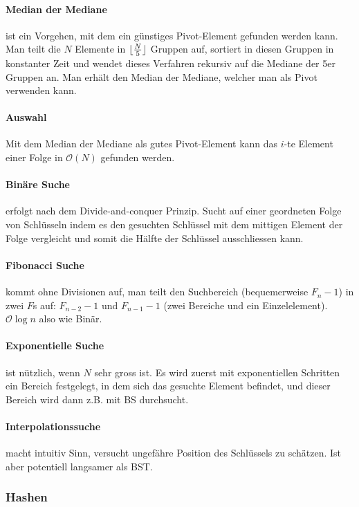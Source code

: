 \documentclass[a4paper, 9pt, DIV=20]{scrartcl}
\DeclarePairedDelimiter{\floor}{\lfloor}{\rfloor}
\newcommand{\Oh}{\mathcal{O}}
\begin{document}
\paragraph{Median der Mediane} ist ein Vorgehen, mit dem ein günstiges Pivot-Element gefunden werden kann. Man teilt die $N$ Elemente in $\floor{\frac{N}{5}}$ Gruppen auf, sortiert in diesen Gruppen in konstanter Zeit und wendet dieses Verfahren rekursiv auf die Mediane der 5er Gruppen an. Man erhält den Median der Mediane, welcher man als Pivot verwenden kann.

\paragraph{Auswahl} Mit dem Median der Mediane als gutes Pivot-Element kann das $i$-te Element einer Folge in $\Oh(N)$ gefunden werden.

\paragraph{Binäre Suche} erfolgt nach dem Divide-and-conquer Prinzip. Sucht auf einer geordneten Folge von Schlüsseln indem es den gesuchten Schlüssel mit dem mittigen Element der Folge vergleicht und somit die Hälfte der Schlüssel ausschliessen kann.

\paragraph{Fibonacci Suche} kommt ohne Divisionen auf, man teilt den Suchbereich (bequemerweise $F_{n}-1$) in zwei $F$s auf: $F_{n-2}-1$ und $F_{n-1}-1$ (zwei Bereiche und ein Einzelelement). $\Oh{\log{n}}$ also wie Binär.

\paragraph{Exponentielle Suche} ist nützlich, wenn $N$ sehr gross ist. Es wird zuerst mit exponentiellen Schritten ein Bereich festgelegt, in dem sich das gesuchte Element befindet, und dieser Bereich wird dann z.B. mit BS durchsucht.

\paragraph{Interpolationssuche} macht intuitiv Sinn, versucht ungefähre Position des Schlüssels zu schätzen. Ist aber potentiell langsamer als BST.

\subsubsection{Hashen}
\end{document}
